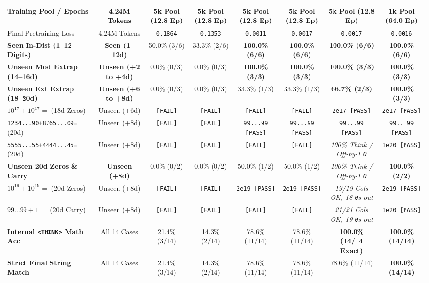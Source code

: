 \documentclass[10pt,twocolumn]{article}
\begin{document}
\begin{table}[t]
{\begin{tabular}{@{}lccccccc@{}}
\textbf{Training Pool / Epochs} & 4.24M Tokens & 5k Pool (12.8 Ep) & 5k Pool (12.8 Ep) & 5k Pool (12.8 Ep) & 5k Pool (12.8 Ep) & 5k Pool (12.8 Ep) & 1k Pool (64.0 Ep) \\
\midrule
Final Pretraining Loss & 4.24M Tokens & \texttt{0.1864} & \texttt{0.1353} & \texttt{0.0011} & \texttt{0.0017} & \texttt{0.0017} & \texttt{0.0016} \\
\textbf{Seen In-Dist (1--12 Digits)} & \textbf{Seen (1--12d)} & 50.0\% (3/6) & 33.3\% (2/6) & \textbf{100.0\% (6/6)} & \textbf{100.0\% (6/6)} & \textbf{100.0\% (6/6)} & \textbf{100.0\% (6/6)} \\
\textbf{Unseen Mod Extrap (14--16d)} & \textbf{Unseen (+2 to +4d)} & 0.0\% (0/3) & 0.0\% (0/3) & \textbf{100.0\% (3/3)} & \textbf{100.0\% (3/3)} & \textbf{100.0\% (3/3)} & \textbf{100.0\% (3/3)} \\
\textbf{Unseen Ext Extrap (18--20d)} & \textbf{Unseen (+6 to +8d)} & 0.0\% (0/3) & 0.0\% (0/3) & 33.3\% (1/3) & 33.3\% (1/3) & \textbf{66.7\% (2/3)} & \textbf{100.0\% (3/3)} \\
\quad $10^{17}+10^{17}=$ (18d Zeros) & Unseen (+6d) & \texttt{[FAIL]} & \texttt{[FAIL]} & \texttt{[FAIL]} & \texttt{[FAIL]} & \texttt{2e17 [PASS]} & \texttt{2e17 [PASS]} \\
\quad \texttt{1234...90+8765...09=} (20d) & Unseen (+8d) & \texttt{[FAIL]} & \texttt{[FAIL]} & \texttt{99...99 [PASS]} & \texttt{99...99 [PASS]} & \texttt{99...99 [PASS]} & \texttt{99...99 [PASS]} \\
\quad \texttt{5555...55+4444...45=} (20d) & Unseen (+8d) & \texttt{[FAIL]} & \texttt{[FAIL]} & \texttt{[FAIL]} & \texttt{[FAIL]} & \textit{100\% Think / Off-by-1 \texttt{0}} & \texttt{1e20 [PASS]} \\
\textbf{Unseen 20d Zeros \& Carry} & \textbf{Unseen (+8d)} & 0.0\% (0/2) & 0.0\% (0/2) & 50.0\% (1/2) & 50.0\% (1/2) & \textit{100\% Think / Off-by-1 \texttt{0}} & \textbf{100.0\% (2/2)} \\
\quad $10^{19}+10^{19}=$ (20d Zeros) & Unseen (+8d) & \texttt{[FAIL]} & \texttt{[FAIL]} & \texttt{2e19 [PASS]} & \texttt{2e19 [PASS]} & \textit{19/19 Cols OK, 18 \texttt{0}s out} & \texttt{2e19 [PASS]} \\
\quad $99\dots99+1=$ (20d Carry) & Unseen (+8d) & \texttt{[FAIL]} & \texttt{[FAIL]} & \texttt{[FAIL]} & \texttt{[FAIL]} & \textit{21/21 Cols OK, 19 \texttt{0}s out} & \texttt{1e20 [PASS]} \\
\midrule
\textbf{Internal \texttt{<THINK>} Math Acc} & All 14 Cases & 21.4\% (3/14) & 14.3\% (2/14) & 78.6\% (11/14) & 78.6\% (11/14) & \textbf{100.0\% (14/14 Exact)} & \textbf{100.0\% (14/14)} \\
\textbf{Strict Final String Match} & All 14 Cases & 21.4\% (3/14) & 14.3\% (2/14) & 78.6\% (11/14) & 78.6\% (11/14) & 78.6\% (11/14) & \textbf{100.0\% (14/14)} \\
\bottomrule
\end{tabular}%
}
\end{table}
\end{document}
